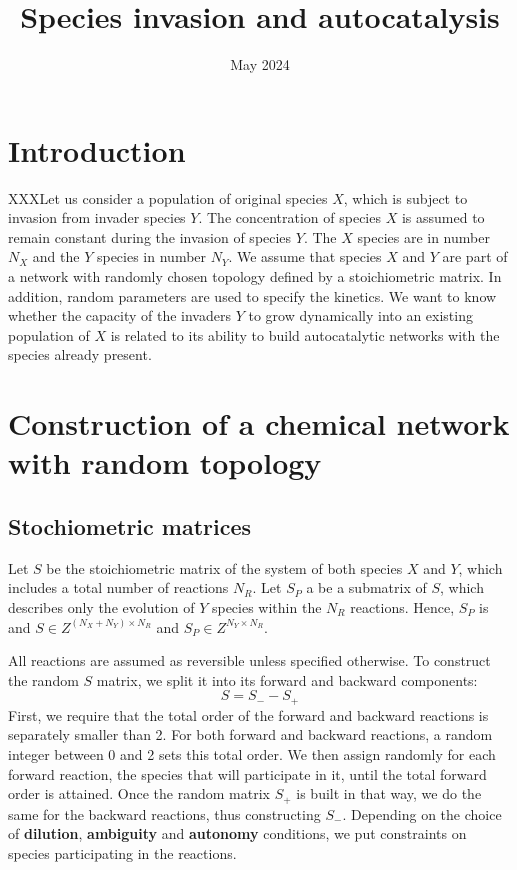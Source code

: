 \documentclass{article}
\title{Species invasion and autocatalysis}
\date{May 2024}
\begin{document}
\maketitle

\section{Introduction}
XXXLet us consider a population of original species $X$, which is subject to invasion from invader species $Y$. The concentration of species $X$ is assumed to remain constant during the invasion of species $Y$. The $X$ species are in number $N_X$ and the $Y$ species in number $N_Y$. We assume that species $X$ and $Y$ are part of a network with randomly chosen topology defined by a stoichiometric matrix. In addition, random parameters are used to specify the kinetics.  We want to know whether the capacity of the invaders $Y$ to grow dynamically into an existing population of $X$ is related to its ability to build autocatalytic networks with the species already present. 

\section{Construction of a chemical network with random topology}
\subsection{Stochiometric matrices}
Let $S$ be the stoichiometric matrix of the system of both species $X$ and $Y$, which  includes a total number of reactions $N_R$. Let $S_P$ a be a submatrix of $S$, which describes only the evolution of $Y$ species within the $N_R$ reactions. Hence, $S_P$ is and $S \in Z^{(N_X+N_Y) \times N_R}$ and 
$S_P \in  Z^{N_Y \times N_R}$.

All reactions are assumed as reversible unless specified otherwise. To construct the random $S$ matrix, we split it into its forward and backward components:
\begin{equation}
    S= S_- - S_+
\end{equation}
First, we require that the total order of the forward and backward reactions is separately smaller than 2. For both forward and backward reactions, a random integer between 0 and 2 sets this total order. We then assign randomly for each forward reaction, the species that will participate in it, until the total forward order is attained. Once the random matrix $S_+$ is built in that way, we do the same for the backward reactions, thus constructing $S_-$. Depending on the choice of \textbf{dilution}, \textbf{ambiguity} and \textbf{autonomy} conditions, we put constraints on species participating in the reactions.
\end{document}
